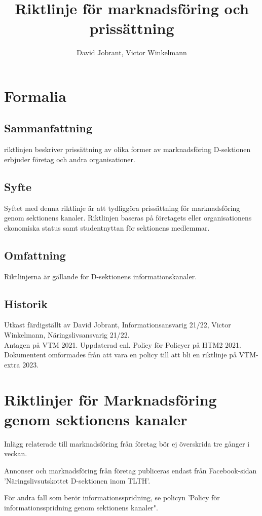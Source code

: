\documentclass{dsekprotokoll}
\title{Riktlinje för marknadsföring och prissättning}
\author{David Jobrant, Victor Winkelmann}
\begin{document}
\maketitle
\section{Formalia}
\subsection{Sammanfattning}
riktlinjen beskriver prissättning av olika former av marknadsföring D-sektionen erbjuder företag och andra organisationer.

\subsection{Syfte}
Syftet med denna riktlinje är att tydliggöra prissättning för marknadsföring genom sektionens kanaler. Riktlinjen baseras på företagets eller organisationens ekonomiska status samt studentnyttan för sektionens medlemmar.

\subsection{Omfattning}
Riktlinjerna är gällande för D-sektionens informationskanaler.

\subsection{Historik}
Utkast färdigställt av David Jobrant, Informationsansvarig 21/22, Victor Winkelmann, Näringslivsansvarig 21/22. \\
Antagen på VTM 2021.
Uppdaterad enl. Policy för Policyer på HTM2 2021. Dokumentent omformades från att vara en policy till att bli en riktlinje på VTM-extra 2023.

\section{Riktlinjer för Marknadsföring genom sektionens kanaler}
Inlägg relaterade till marknadsföring från företag bör ej överskrida tre gånger i veckan.

Annonser och marknadsföring från företag publiceras endast från Facebook-sidan 'Näringslivsutskottet D-sektionen inom TLTH'.

För andra fall som berör informationsspridning, se policyn 'Policy för informationsspridning genom sektionens kanaler".
\end{document}
